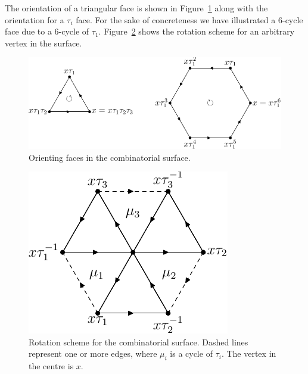 \documentclass[12pt,amstags,fleqn]{article}
\theoremstyle{plain}
\theoremstyle{definition}
\begin{document}
The orientation of a triangular face is
shown in Figure~\ref{figTwoOrientations} along with the orientation for
a $\tau_i$ face. For the sake of concreteness we have illustrated a
$6$-cycle face due to a $6$-cycle of $\tau_1$. 
Figure~\ref{figDrapalRotationScheme} shows
the rotation scheme for an arbitrary vertex in the surface.
\begin{figure}[htb]
\begin{center}
\includegraphics{drRotationScheme-1.pdf}
\end{center}
\caption{Orienting faces in the combinatorial surface.}
\label{figTwoOrientations}
\end{figure}
\begin{figure}[htb]
\begin{center}
\includegraphics{drRotationScheme-2.pdf}
\end{center}
\caption{Rotation scheme for the combinatorial surface. Dashed
lines represent one or more edges, where $\mu_i$ is a cycle of $\tau_i$.
The vertex in the centre is $x$.}
\label{figDrapalRotationScheme}
\end{figure}
\end{document}
